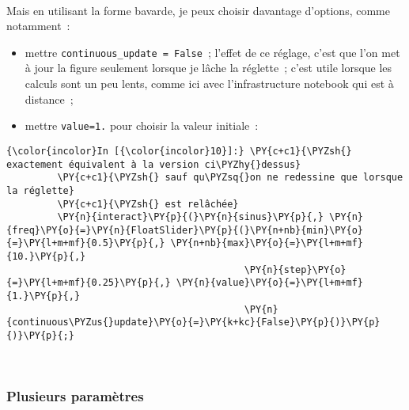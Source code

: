     \begin{center}
    \end{center}
    { \hspace*{\fill} \\}
    
    Mais en utilisant la forme bavarde, je peux choisir davantage d'options,
comme notamment~:

\begin{itemize}
\tightlist
\item
  mettre \texttt{continuous\_update\ =\ False}~; l'effet de ce réglage,
  c'est que l'on met à jour la figure seulement lorsque je lâche la
  réglette~; c'est utile lorsque les calculs sont un peu lents, comme
  ici avec l'infrastructure notebook qui est à distance~;
\item
  mettre \texttt{value=1.} pour choisir la valeur initiale~:
\end{itemize}

    \begin{Verbatim}[commandchars=\\\{\},frame=single,framerule=0.3mm,rulecolor=\color{cellframecolor}]
{\color{incolor}In [{\color{incolor}10}]:} \PY{c+c1}{\PYZsh{} exactement équivalent à la version ci\PYZhy{}dessus}
         \PY{c+c1}{\PYZsh{} sauf qu\PYZsq{}on ne redessine que lorsque la réglette}
         \PY{c+c1}{\PYZsh{} est relâchée}
         \PY{n}{interact}\PY{p}{(}\PY{n}{sinus}\PY{p}{,} \PY{n}{freq}\PY{o}{=}\PY{n}{FloatSlider}\PY{p}{(}\PY{n+nb}{min}\PY{o}{=}\PY{l+m+mf}{0.5}\PY{p}{,} \PY{n+nb}{max}\PY{o}{=}\PY{l+m+mf}{10.}\PY{p}{,} 
                                          \PY{n}{step}\PY{o}{=}\PY{l+m+mf}{0.25}\PY{p}{,} \PY{n}{value}\PY{o}{=}\PY{l+m+mf}{1.}\PY{p}{,}
                                          \PY{n}{continuous\PYZus{}update}\PY{o}{=}\PY{k+kc}{False}\PY{p}{)}\PY{p}{)}\PY{p}{;}
\end{Verbatim}


    \begin{center}
    \end{center}
    { \hspace*{\fill} \\}
    
    \hypertarget{plusieurs-paramuxe8tres}{%
\subsubsection{Plusieurs paramètres}\label{plusieurs-paramuxe8tres}}

